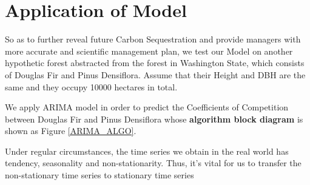 \documentclass{mcmthesis}
\numberwithin{figure}{section}
\numberwithin{table}{section}
\numberwithin{equation}{section}
\begin{document}
\section{Application of Model}
So as to further reveal future Carbon Sequestration and provide managers with 
more accurate and scientific management plan, we test our Model on another
hypothetic forest abstracted from the forest in Washington State, which 
consists of Douglas Fir and Pinus Densiflora. Assume that their Height and DBH are
the same and they occupy 10000 hectares in total. 
\par
We apply ARIMA model in order to predict the Coefficients of Competition between 
Douglas Fir and Pinus Densiflora whose \textbf{algorithm block diagram} 
is shown as Figure \ref{ARIMA_ALGO}.
\par
Under regular circumstances, the time series we obtain in the real world
  has tendency, seasonality and non-stationarity. Thus, it's vital for 
  us to transfer the non-stationary time series to stationary time series
\par
\end{document}
